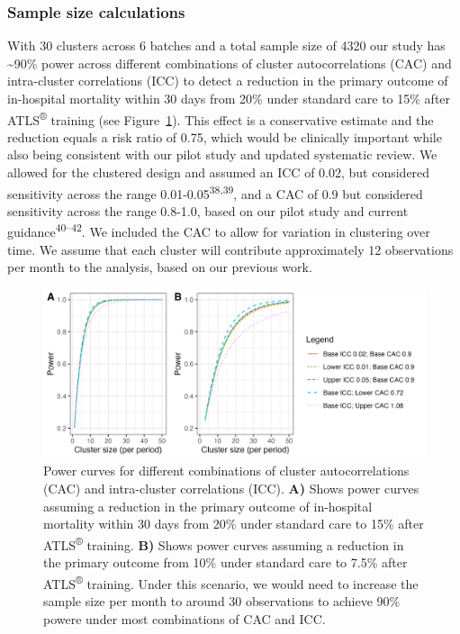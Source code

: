 \documentclass[
]{scrartcl}
\begin{document}
\hypertarget{sample-size-calculations}{%
\subsubsection{Sample size
calculations}\label{sample-size-calculations}}

With 30 clusters across 6 batches and a total sample size of 4320 our
study has \textasciitilde90\% power across different combinations of
cluster autocorrelations (CAC) and intra-cluster correlations (ICC) to
detect a reduction in the primary outcome of in-hospital mortality
within 30 days from 20\% under standard care to 15\% after
ATLS\textsuperscript{®} training (see Figure~\ref{fig-power-curves}).
This effect is a conservative estimate and the reduction equals a risk
ratio of 0.75, which would be clinically important while also being
consistent with our pilot study and updated systematic review. We
allowed for the clustered design and assumed an ICC of 0.02, but
considered sensitivity across the range
0.01-0.05\textsuperscript{38,39}, and a CAC of 0.9 but considered
sensitivity across the range 0.8-1.0, based on our pilot study and
current guidance\textsuperscript{40--42}. We included the CAC to allow
for variation in clustering over time. We assume that each cluster will
contribute approximately 12 observations per month to the analysis,
based on our previous work.

\begin{figure}

{\centering \includegraphics{./combined-power-curves.png}

}

\caption{\label{fig-power-curves}Power curves for different combinations
of cluster autocorrelations (CAC) and intra-cluster correlations (ICC).
\textbf{A)} Shows power curves assuming a reduction in the primary
outcome of in-hospital mortality within 30 days from 20\% under standard
care to 15\% after ATLS\textsuperscript{®} training. \textbf{B)} Shows
power curves assuming a reduction in the primary outcome from 10\% under
standard care to 7.5\% after ATLS\textsuperscript{®} training. Under
this scenario, we would need to increase the sample size per month to
around 30 observations to achieve 90\% powere under most combinations of
CAC and ICC.}

\end{figure}
\end{document}
